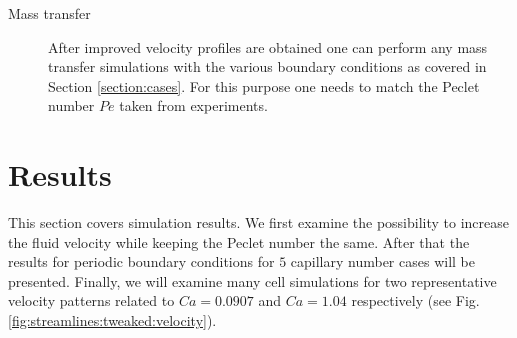 \documentclass[preprint,12pt]{elsarticle}
\newcommand{\ububble}{U_{\mathrm{bubble}}}
\begin{document}
\begin{description}
\item[Mass transfer] After improved velocity profiles are obtained one can perform any mass
transfer simulations with the various boundary conditions as covered in Section \ref{section:cases}.
For this purpose one needs to match the Peclet number $Pe$ taken from experiments. 
\end{description}

\section{Results}
This section covers simulation results. We first examine the possibility to increase the fluid
velocity while keeping the Peclet number the same. After that  the results for  periodic boundary
conditions for $5$ capillary number cases will be presented. Finally, we will examine
many
cell simulations for two representative velocity patterns related to $Ca=0.0907$ and $Ca=1.04$ respectively 
(see Fig. \ref{fig:streamlines:tweaked:velocity}). 
\end{document}
